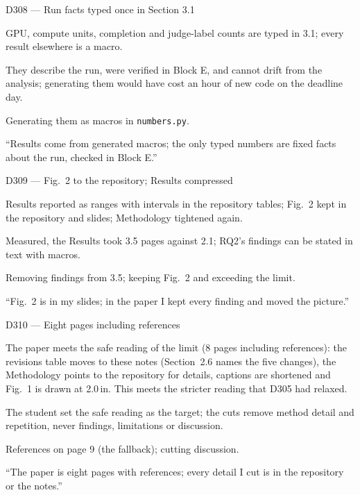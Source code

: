 \documentclass[11pt,a4paper]{report}
\begin{document}
\begin{decisionbox}{D308 --- Run facts typed once in Section 3.1}
\begin{description}[nosep, leftmargin=0pt]
  \item[Decision.] GPU, compute units, completion and judge-label counts are typed in 3.1; every result elsewhere is a macro.
  \item[Why.] They describe the run, were verified in Block E, and cannot drift from the analysis; generating them would have cost an hour of new code on the deadline day.
  \item[Alternatives.] Generating them as macros in \texttt{numbers.py}.
  \item[Interview line.] ``Results come from generated macros; the only typed numbers are fixed facts about the run, checked in Block E.''
\end{description}
\end{decisionbox}

\begin{decisionbox}{D309 --- Fig.~2 to the repository; Results compressed}
\begin{description}[nosep, leftmargin=0pt]
  \item[Decision.] Results reported as ranges with intervals in the repository tables; Fig.~2 kept in the repository and slides; Methodology tightened again.
  \item[Why.] Measured, the Results took 3.5 pages against 2.1; RQ2's findings can be stated in text with macros.
  \item[Alternatives.] Removing findings from 3.5; keeping Fig.~2 and exceeding the limit.
  \item[Interview line.] ``Fig.~2 is in my slides; in the paper I kept every finding and moved the picture.''
\end{description}
\end{decisionbox}

\begin{decisionbox}{D310 --- Eight pages including references}
\begin{description}[nosep, leftmargin=0pt]
  \item[Decision.] The paper meets the safe reading of the limit (8 pages including references): the revisions table moves to these notes (Section~2.6 names the five changes), the Methodology points to the repository for details, captions are shortened and Fig.~1 is drawn at 2.0\,in. This meets the stricter reading that D305 had relaxed.
  \item[Why.] The student set the safe reading as the target; the cuts remove method detail and repetition, never findings, limitations or discussion.
  \item[Alternatives.] References on page 9 (the fallback); cutting discussion.
  \item[Interview line.] ``The paper is eight pages with references; every detail I cut is in the repository or the notes.''
\end{description}
\end{decisionbox}
\end{document}
